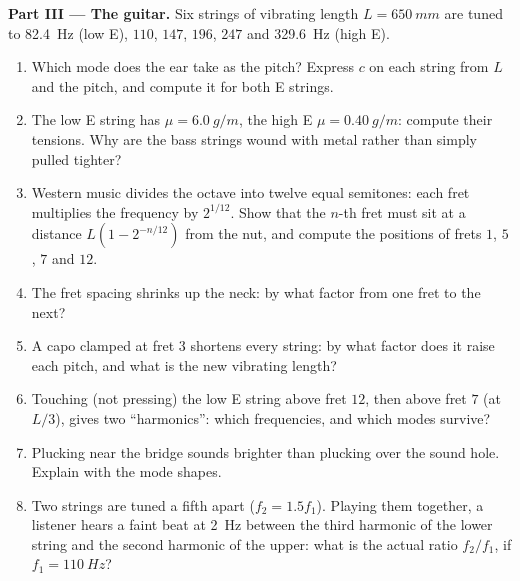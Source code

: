 \begin{problem}
\medskip
\noindent\textbf{Part III --- The guitar.}
Six strings of vibrating length $L = \qty{650}{mm}$ are tuned to
\qty{82.4}{Hz} (low E), $110$, $147$, $196$, $247$ and \qty{329.6}{Hz}
(high E).
\begin{enumerate}[resume]
  \item Which mode does the ear take as the pitch? Express $c$ on each
        string from $L$ and the pitch, and compute it for both E strings.
  \item The low E string has $\mu = \qty{6.0}{g/m}$, the high E
        $\mu = \qty{0.40}{g/m}$: compute their tensions. Why are the bass
        strings wound with metal rather than simply pulled tighter?
  \item Western music divides the octave into twelve equal semitones:
        each fret multiplies the frequency by $2^{1/12}$. Show that the
        $n$-th fret must sit at a distance $L(1 - 2^{-n/12})$ from the
        nut, and compute the positions of frets $1$, $5$, $7$ and $12$.
  \item The fret spacing shrinks up the neck: by what factor from one
        fret to the next?
  \item A capo clamped at fret $3$ shortens every string: by what
        factor does it raise each pitch, and what is the new vibrating
        length?
  \item Touching (not pressing) the low E string above fret $12$, then
        above fret $7$ (at $L/3$), gives two ``harmonics'': which
        frequencies, and which modes survive?
  \item Plucking near the bridge sounds brighter than plucking over the
        sound hole. Explain with the mode shapes.
  \item Two strings are tuned a fifth apart ($f_2 = 1.5f_1$). Playing
        them together, a listener hears a faint beat at \qty{2}{Hz}
        between the third harmonic of the lower string and the second
        harmonic of the upper: what is the actual ratio $f_2/f_1$, if
        $f_1 = \qty{110}{Hz}$?
\end{enumerate}


\end{problem}
